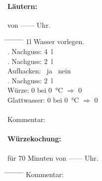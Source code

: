 \documentclass[12pt,oneside,a4paper]{scrartcl}
\begin{document}
{\paragraph{Läutern:} von ------ Uhr.
	\begin{tabbing}
		\hspace{1cm} \= \hspace{1cm} \= \hspace{1cm} \= \hspace{1cm} \= \hspace{1cm} \=\hspace{1cm} \=\hspace{1cm} \=\hspace{1cm} \= \kill
		\> 1l Wasser vorlegen.\\
		\> . Nachguss: \> \> \> \SI{4}{\litre}\\
		\> . Nachguss: \> \> \> \SI{2}{\litre}\\
		\> \> \> Aufhacken: \> \> \Square \ ja \> \> \Square \ nein\\
		\> . Nachguss: \> \> \> \SI{2}{\litre}\\
		\> Würze: \> \> \> \SI{0}{\plato} \> bei \> \SI{0}{\degreeCelsius} \> $\Rightarrow$ \> \SI{0}{\plato}\\
		\> Glattwasser: \> \> \> \SI{0}{\plato} \> bei \> \SI{0}{\degreeCelsius} \> $\Rightarrow$ \> \SI{0}{\plato}\\\\
		\> Kommentar: \>\>\> 
	\end{tabbing}
%
\paragraph{Würzekochung:} für 70 Minuten von ------ Uhr.
	\begin{tabbing}
		\hspace{1cm} \= \hspace{1cm} \= \hspace{1cm} \= \hspace{1cm} \= \hspace{1cm} \= \hspace{1cm} \= \hspace{1cm} \= \hspace{1cm} \= \kill
		\> Kommentar: \> \> \> 
	\end{tabbing}
%
}
\end{document}
